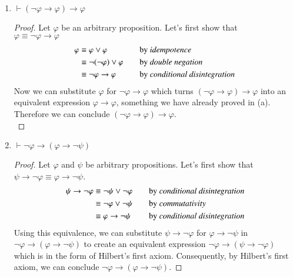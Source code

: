 \documentclass{article}
\newcommand{\lif}{\mathrel{\rightarrow}}
\newcommand{\proves}{\mathrel{\vdash}}
\begin{document}
\begin{enumerate}
\begin{enumerate}
        \item $\proves (\neg \varphi \lif \varphi) \lif \varphi$
        \begin{proof} 
        Let $\varphi$ be an arbitrary proposition. Let's first show that \\$\varphi \equiv \neg \varphi \lif \varphi $
        \begin{align*}
          \varphi
            &\equiv \varphi\lor\varphi
              &\quad 
              &\text{by \emph{idempotence}}
              \\
            &\equiv \neg(\neg\varphi)\lor\varphi
              &\quad
              &\text{by \emph{double negation}}
              \\
            &\equiv \neg \varphi \lif \varphi
              &\quad
              &\text{by \emph{conditional disintegration}}
        \end{align*}
        Now we can substitute $\varphi$ for $\neg \varphi \lif \varphi $ which turns $(\neg \varphi \lif \varphi) \lif \varphi$ into an equivalent expression $\varphi \lif \varphi$, something we have already proved in (a). Therefore we can conclude $(\neg \varphi \lif \varphi) \lif \varphi$.
        \\
        \end{proof}
        \item $\proves \neg \varphi \lif (\varphi \lif \neg \psi)$
        \begin{proof}
        Let $\varphi$ and $\psi$ be arbitrary propositions. Let's first show that \\$\psi \lif \neg \varphi \equiv \varphi \lif \neg \psi$.
        \begin{align*}
          \psi \lif \neg \varphi
            &\equiv \neg\psi\lor\neg\varphi
              &\quad
              &\text{by \emph{conditional disintegration}}
              \\
            &\equiv \neg\varphi\lor\neg\psi
              &\quad
              &\text{by \emph{commutativity}}
              \\
            &\equiv \varphi \lif \neg \psi 
              &\quad
              &\text{by \emph{conditional disintegration}}
        \end{align*}
        Using this equivalence, we can substitute $\psi \lif \neg \varphi$ for $\varphi \lif \neg \psi$ in $\neg \varphi \lif (\varphi \lif \neg \psi)$ to create an equivalent expression $\neg \varphi \lif (\psi \lif \neg \varphi)$ which is in the form of Hilbert's first axiom. Consequently, by Hilbert's first axiom, we can conclude $\neg \varphi \lif (\varphi \lif \neg \psi)$.

\end{proof}
\end{enumerate}
\end{enumerate}
\end{document}
